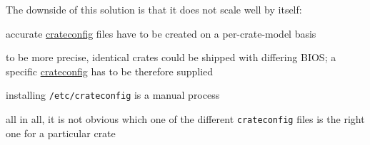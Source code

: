 \documentclass[a4paper]{article}
\newcommand\fname[1]{\texttt{#1}}
\begin{document}
The downside of this solution is that it does not scale well by itself:
\begin{compactitem}
\item accurate \url{crateconfig} files have to be created on
	a per-crate-model basis
\item to be more precise, identical crates could be shipped with
	differing BIOS; a specific \url{crateconfig} has to be
	therefore supplied
\item installing \fname{/etc/crateconfig} is a manual process
\item all in all, it is not obvious which one of the different \fname{crateconfig}
	files is the right one for a particular crate
\end{compactitem}
\end{document}
